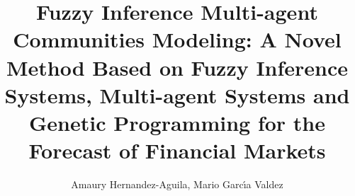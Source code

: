 \documentclass[12pt,journal,draftcls,onecolumn]{IEEEtran}
\begin{document}
%
\title{Fuzzy Inference Multi-agent Communities Modeling: A Novel Method Based
on Fuzzy Inference Systems, Multi-agent Systems and Genetic Programming
for the Forecast of Financial Markets}

%
%
%
%

\author{Amaury Hernandez-Aguila, Mario Garc{\'{\i}}a Valdez
}%
\end{document}
